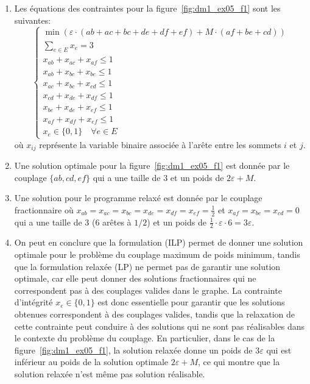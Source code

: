 {\begin{td-sol}[]
\begin{enumerate}
			\item Les équations des contraintes pour la figure~\ref{fig:dm1_ex05_f1} sont les suivantes:
			\begin{equation*}
				\begin{cases}
					\min \left(\varepsilon \cdot \left(ab + ac + bc + de + df + ef\right) + M \cdot \left(af + be + cd\right)\right)\\
					\sum_{e\in E} x_e = 3 \\
					x_{ab} + x_{ac} + x_{af} \leq 1 \\
					x_{ab} + x_{bc} + x_{be} \leq 1 \\
					x_{ac} + x_{bc} + x_{cd} \leq 1 \\
					x_{cd} + x_{de} + x_{df} \leq 1 \\
					x_{be} + x_{de} + x_{ef} \leq 1 \\
					x_{af} + x_{df} + x_{ef} \leq 1 \\
					x_e \in \{0, 1\} \quad \forall e \in E
				\end{cases}
			\end{equation*}
			où \(x_{ij}\) représente la variable binaire associée à l'arête entre les sommets \(i\) et \(j\).

			\item Une solution optimale pour la figure~\ref{fig:dm1_ex05_f1} est donnée par le couplage \(\{ab, cd, ef\}\) qui a une taille de \(3\) et un poids de \(2 \varepsilon + M\).

			\item Une solution pour le programme relaxé est donnée par le couplage fractionnaire où \(x_{ab} = x_{ac} = x_{bc} = x_{de} = x_{df} = x_{ef} = \frac{1}{2}\) et \(x_{af} = x_{be} = x_{cd} = 0\) qui a une taille de \(3\) (6 arêtes à \(1/2\)) et un poids de \(\frac{1}{2} \cdot \varepsilon \cdot 6 = 3 \varepsilon\).

			\item On peut en conclure que la formulation (ILP) permet de donner une solution optimale pour le problème du couplage maximum de poids minimum, tandis que la formulation relaxée (LP) ne permet pas de garantir une solution optimale, car elle peut donner des solutions fractionnaires qui ne correspondent pas à des couplages valides dans le graphe.
			La contrainte d'intégrité \(x_e \in \{0, 1\}\) est donc essentielle pour garantir que les solutions obtenues correspondent à des couplages valides, tandis que la relaxation de cette contrainte peut conduire à des solutions qui ne sont pas réalisables dans le contexte du problème du couplage.
			En particulier, dans le cas de la figure~\ref{fig:dm1_ex05_f1}, la solution relaxée donne un poids de \(3 \varepsilon\) qui est inférieur au poids de la solution optimale \(2 \varepsilon + M\), ce qui montre que la solution relaxée n'est même pas solution réalisable.


\end{enumerate}
\end{td-sol}}
